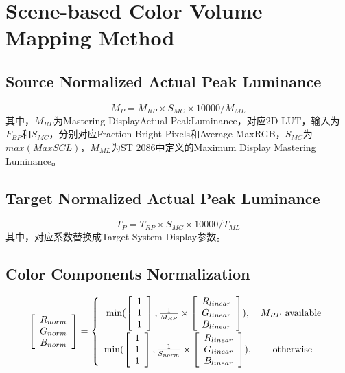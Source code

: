 \documentclass{article}
\begin{document}
\section{Scene-based Color Volume Mapping Method}

\subsection{Source Normalized Actual Peak Luminance}
$$M_P = M_{RP} \times S_{MC} \times 10000 / M_{ML}$$
其中，$M_{RP}$为Mastering DisplayActual PeakLuminance，对应2D LUT，输入为$F_{BP}$和$S_{MC}$，分别对应Fraction Bright Pixels和Average MaxRGB，$S_{MC}$为$max(MaxSCL)$，$M_{ML}$为ST 2086中定义的Maximum Display Mastering Luminance。

\subsection{Target Normalized Actual Peak Luminance}
$$T_P = T_{RP} \times S_{MC} \times 10000 / T_{ML}$$
其中，对应系数替换成Target System Display参数。
\subsection{Color Components Normalization}
\begin{equation}
    \left[ \begin{array}{c}
        R_{norm} \\ G_{norm} \\ B_{norm}
    \end{array} \right]
    = \left\{ \begin{array}{cc}
        \min(\left[ \begin{array}{c} 1 \\ 1 \\ 1 \end{array} \right],\frac{1}{M_{RP}}\times \left[ \begin{array}{c} R_{linear} \\ G_{linear} \\ B_{linear} \end{array}\right]), \vspace{0.5ex} & M_{RP} \mbox{ available} \\
        \min(\left[ \begin{array}{c} 1 \\ 1 \\ 1 \end{array} \right],\frac{1}{S_{norm}}\times \left[ \begin{array}{c} R_{linear} \\ G_{linear} \\ B_{linear} \end{array}\right]), & \mbox{ otherwise} 
    \end{array} \right.
\end{equation}
\end{document}
